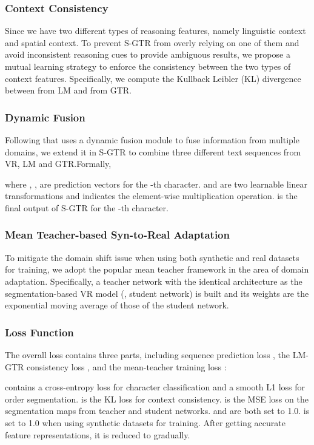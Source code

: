 \documentclass[letterpaper]{article} \usepackage{aaai22}  \usepackage{times}  \usepackage{helvet}  \usepackage{courier}  \usepackage[hyphens]{url}  \usepackage{graphicx} \urlstyle{rm} \def\UrlFont{\rm}  \usepackage{natbib}  \usepackage{caption} \DeclareCaptionStyle{ruled}{labelfont=normalfont,labelsep=colon,strut=off} \frenchspacing  \setlength{\pdfpagewidth}{8.5in}  \setlength{\pdfpageheight}{11in}
\begin{document}
\subsubsection{Context Consistency}
Since we have two different types of reasoning features, namely linguistic context and spatial context. To prevent S-GTR from overly relying on one of them and avoid inconsistent reasoning cues to provide ambiguous results, we propose a mutual learning strategy to enforce the consistency between the two types of context features. Specifically, we compute the Kullback Leibler (KL) divergence between  from LM and  from GTR. 


\subsubsection{Dynamic Fusion}
\label{subsec:dynamicfusion}
Following \cite{yue2020robustscanner} that uses a dynamic fusion module to fuse information from multiple domains, we extend it in S-GTR to combine three different text sequences from VR, LM and GTR.Formally,

where , ,  are prediction vectors for the -th character.  and  are two learnable linear transformations and  indicates the element-wise multiplication operation.  is the final output of S-GTR for the -th character.



\subsubsection{Mean Teacher-based Syn-to-Real Adaptation}
To mitigate the domain shift issue when using both synthetic and real datasets for training, we adopt the popular mean teacher framework \cite{meanteacher} in the area of domain adaptation. Specifically, a teacher network with the identical architecture as the segmentation-based VR model (, student network) is built and its weights are the exponential moving average of those of the student network.



\subsubsection{Loss Function}
The overall loss contains three parts, including sequence prediction loss , the LM-GTR consistency loss , and the mean-teacher training loss :

 contains a cross-entropy loss for character classification and a smooth L1 loss for order segmentation.  is the KL loss for context consistency.  is the MSE loss on the segmentation maps from teacher and student networks.  and  are both set to 1.0.  is set to 1.0 when using synthetic datasets for training. After getting accurate feature representations, it is reduced to  gradually.
\end{document}
